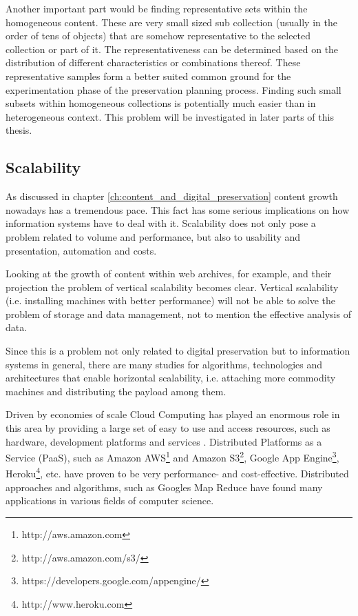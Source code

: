 Another important part would be finding representative sets within the homogeneous content. These are very small sized sub collection (usually in the order of tens of objects) that are somehow representative to the selected collection or part of it. The representativeness can be determined based on the distribution of different characteristics or combinations thereof. These representative samples form a better suited common ground for the experimentation phase of the preservation planning process. Finding such small subsets within homogeneous collections is potentially much easier than in heterogeneous context. This problem will be investigated in later parts of this thesis.

\subsection{Scalability}
As discussed in chapter \ref{ch:content_and_digital_preservation} content growth nowadays has a tremendous pace. This fact has some serious implications on how information systems have to deal with it. Scalability does not only pose a problem related to volume and performance, but also to usability and presentation, automation and costs.

Looking at the growth of content within web archives, for example, and their projection the problem of vertical scalability becomes clear. Vertical scalability (i.e. installing machines with better performance) will not be able to solve the problem of storage and data management, not to mention the effective analysis of data.

Since this is a problem not only related to digital preservation but to information systems in general, there are many studies for algorithms, technologies and architectures that enable horizontal scalability, i.e. attaching more commodity machines and distributing the payload among them.

Driven by economies of scale Cloud Computing has played an enormous role in this area by providing a large set of easy to use and access resources, such as hardware, development platforms and services \cite{Vaquero:2008, 4738445}. Distributed Platforms as a Service (PaaS), such as Amazon AWS\footnote{http://aws.amazon.com} and Amazon S3\footnote{http://aws.amazon.com/s3/}, Google App Engine\footnote{https://developers.google.com/appengine/}, Heroku\footnote{http://www.heroku.com}, etc. have proven to be very performance- and cost-effective. Distributed approaches and algorithms, such as Googles Map Reduce \cite{Dean:2008:MSD:1327452.1327492} have found many applications in various fields of computer science. 

